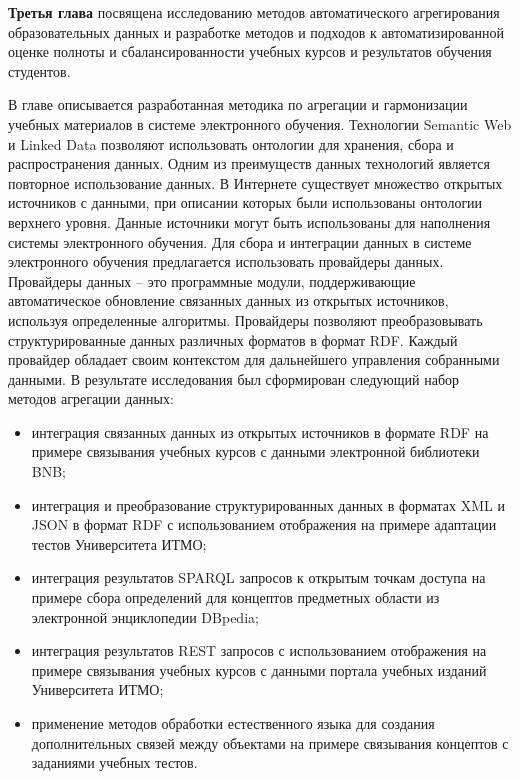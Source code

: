 \textbf{Третья глава} посвящена исследованию методов автоматического агрегирования образовательных данных и разработке методов и подходов к автоматизированной оценке полноты и сбалансированности учебных курсов и результатов обучения студентов.  

В главе описывается разработанная методика по агрегации и гармонизации учебных материалов в системе электронного обучения. Технологии Semantic Web и Linked Data позволяют использовать онтологии для хранения, сбора и распространения данных. Одним из преимуществ данных технологий является повторное использование данных. В Интернете существует множество открытых источников с данными, при описании которых были использованы онтологии верхнего уровня. Данные источники могут быть использованы для наполнения системы электронного обучения. Для сбора и интеграции данных в системе электронного обучения предлагается использовать провайдеры данных. Провайдеры данных -- это программные модули, поддерживающие автоматическое обновление связанных данных из открытых источников, используя определенные алгоритмы. Провайдеры позволяют преобразовывать структурированные данных различных форматов в формат RDF. Каждый провайдер обладает своим контекстом для дальнейшего управления собранными данными. В результате исследования был сформирован следующий набор методов агрегации данных:

\begin{itemize}
\item интеграция связанных данных из открытых источников в формате RDF на примере связывания учебных курсов с данными электронной библиотеки BNB;
\item интеграция и преобразование структурированных данных в форматах XML и JSON в формат RDF с использованием отображения на примере адаптации тестов Университета ИТМО;
\item интеграция результатов SPARQL запросов к открытым точкам доступа на примере сбора определений для концептов предметных области из электронной энциклопедии DBpedia;
\item интеграция результатов REST запросов с использованием отображения на примере связывания учебных курсов с данными портала учебных изданий Университета ИТМО;
\item применение методов обработки естественного языка для создания дополнительных связей между объектами на примере связывания концептов с заданиями учебных тестов.
\end{itemize}

